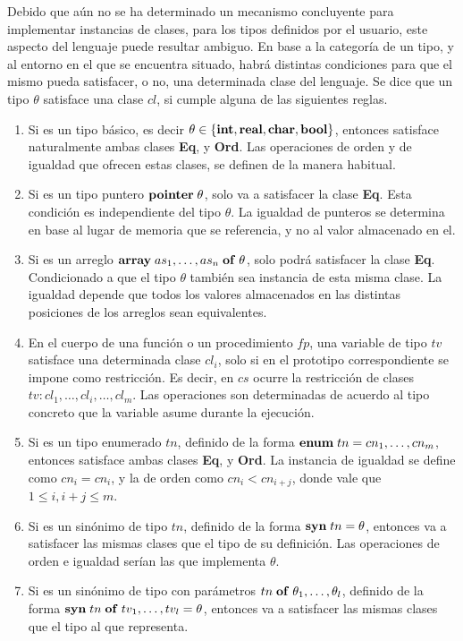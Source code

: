 Debido que aún no se ha determinado un mecanismo concluyente para implementar instancias de clases, para los tipos definidos por el usuario, este aspecto del lenguaje puede resultar ambiguo.
En base a la categoría de un tipo, y al entorno en el que se encuentra situado, habrá distintas condiciones para que el mismo pueda satisfacer, o no, una determinada clase del lenguaje.
Se dice que un tipo $\theta$ satisface una clase $cl$, si cumple alguna de las siguientes reglas.
\begin{enumerate}
\item Si es un tipo básico, es decir $\theta \in \{ \mathbf{int}, \mathbf{real}, \mathbf{char}, \mathbf{bool} \}$, entonces satisface naturalmente ambas clases \textbf{Eq}, y \textbf{Ord}.
Las operaciones de orden y de igualdad que ofrecen estas clases, se definen de la manera habitual.
\item Si es un tipo puntero $\mathbf{pointer} \; \theta$, solo va a satisfacer la clase \textbf{Eq}.
Esta condición es independiente del tipo $\theta$.
La igualdad de punteros se determina en base al lugar de memoria que se referencia, y no al valor almacenado en el.
\item Si es un arreglo $\mathbf{array} \; as_1, \ldots, as_n \; \mathbf{of} \; \theta$, solo podrá satisfacer la clase \textbf{Eq}.
Condicionado a que el tipo $\theta$ también sea instancia de esta misma clase.
La igualdad depende que todos los valores almacenados en las distintas posiciones de los arreglos sean equivalentes. 
\item En el cuerpo de una función o un procedimiento $fp$, una variable de tipo $tv$ satisface una determinada clase $cl_{i}$, solo si en el prototipo correspondiente se impone como restricción.
Es decir, en $cs$ ocurre la restricción de clases $tv : cl_1, \ldots, cl_{i}, \ldots, cl_m$.
Las operaciones son determinadas de acuerdo al tipo concreto que la variable asume durante la ejecución.
\item Si es un tipo enumerado $tn$, definido de la forma $\mathbf{enum} \; tn = cn_1, \ldots, cn_m$, entonces satisface ambas clases \textbf{Eq}, y \textbf{Ord}.
La instancia de igualdad se define como $cn_i = cn_i$, y la de orden como $cn_i < cn_{i + j}$, donde vale que $1 \leq i, i + j \leq m$.
\item Si es un sinónimo de tipo $tn$, definido de la forma $\mathbf{syn} \; tn = \theta$, entonces va a satisfacer las mismas clases que el tipo de su definición.
Las operaciones de orden e igualdad serían las que implementa $\theta$.
\item Si es un sinónimo de tipo con parámetros $tn \; \mathbf{of} \; \theta_1, \ldots, \theta_l$, definido de la forma $\mathbf{syn} \; tn \; \mathbf{of} \allowbreak \; tv_1, \dots, tv_l = \theta$, entonces va a satisfacer las mismas clases que el tipo al que representa.

\end{enumerate}
